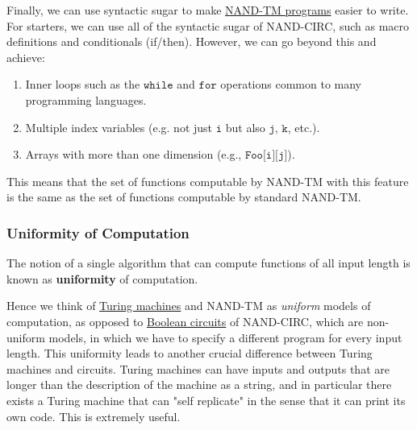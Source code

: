   Finally, we can use syntactic sugar to make \hyperref[def:nand-tm-programs]{NAND-TM programs} easier to write. For starters, we can use all of the syntactic sugar of NAND-CIRC, such as macro definitions and conditionals (if/then). However, we can go beyond this and achieve: 
  \begin{enumerate}
      \item Inner loops such as the $\texttt{while}$ and $\texttt{for}$ operations common to many programming languages. 
      \item Multiple index variables (e.g. not just $\texttt{i}$ but also $\texttt{j, k}$, etc.). 
      \item Arrays with more than one dimension (e.g., $\texttt{Foo[i][j]}$). 
  \end{enumerate}
  This means that the set of functions computable by NAND-TM with this feature is the same as the set of functions computable by standard NAND-TM.

  \subsubsection{Uniformity of Computation}
  \begin{definition}[Uniformity]
    \label{def:uniformity}
  The notion of a single algorithm that can compute functions of all input length is known as \textbf{uniformity} of computation. 
  \end{definition}

  Hence we think of \hyperref[def:turing-machine]{Turing machines} and NAND-TM as \textit{uniform} models of computation, as opposed to \hyperref[def:boolean-circuit]{Boolean circuits} of NAND-CIRC, which are non-uniform models, in which we have to specify a different program for every input length. This uniformity leads to another crucial difference between Turing machines and circuits. Turing machines can have inputs and outputs that are longer than the description of the machine as a string, and in particular there exists a Turing machine that can "self replicate" in the sense that it can print its own code. This is extremely useful. 


